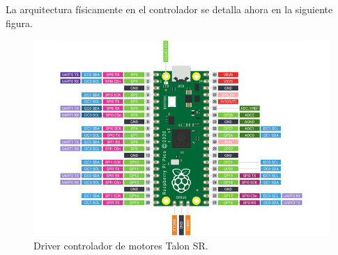 \documentclass[12pt]{book} %
\begin{document}
La arquitectura físicamente en el controlador se detalla ahora en la siguiente figura.

	\begin{figure}[H]
	\begin{center}
	\includegraphics[scale=0.5]{Raspberry-Pi-Pico-Pinout.png}
	\caption{Driver controlador de motores Talon SR.} 
	\end{center}
	\end{figure}
\end{document}
